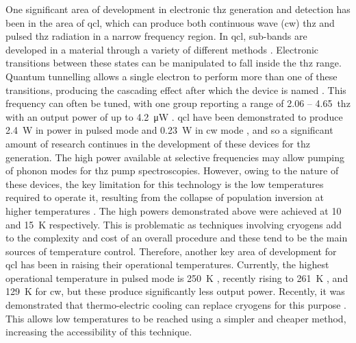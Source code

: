One significant area of development in electronic \acrshort{thz} generation and detection has been in the area of \acrfull{qcl}, which can produce both continuous wave (\acrshort{cw}) \acrshort{thz} and pulsed \acrshort{thz} radiation in a narrow frequency region. In \acrshort{qcl}, sub\nobreakdash-bands are developed in a material through a variety of different methods \DIFdelbegin \DIFdel{~}\DIFdelend \cite{Williams2007}. Electronic transitions between these states can be manipulated to fall inside the \acrshort{thz} range. Quantum tunnelling allows a single electron to perform more than one of these transitions, producing the cascading effect after which the device is named \DIFdelbegin \DIFdel{~}\DIFdelend \cite{Faist1994}.
This frequency can often be tuned, with one group reporting a range of 2.06 – \SI{4.65}{\acrshort{thz}} with an output power of up to \SI{4.2}{\micro W} \DIFdelbegin \DIFdel{~}\DIFdelend \cite{Lu2016}. 
\acrshort{qcl} have been demonstrated to produce \SI{2.4}{W} in power in pulsed mode \DIFdelbegin \DIFdel{~}\DIFdelend \cite{Lin2017} and \SI{0.23}{W} in \acrshort{cw} mode \DIFdelbegin \DIFdel{~}\DIFdelend \cite{Wang2016}, and so a significant amount of research continues in the development of these devices for \acrshort{thz} generation. The high power available at selective frequencies may allow pumping of phonon modes for \acrshort{thz} pump spectroscopies. 
However, owing to the nature of these devices, the key limitation for this technology is the low temperatures required to operate it, resulting from the collapse of population inversion at higher temperatures \DIFdelbegin \DIFdel{~}\DIFdelend \cite{Williams2007}. The high powers demonstrated above were achieved at 10 and \SI{15}{K} respectively. This is problematic as techniques involving cryogens add to the complexity and cost of an overall procedure and these tend to be the main sources of temperature control. Therefore, another key area of development for \acrshort{qcl} has been in raising their operational temperatures. Currently, the highest operational temperature in pulsed mode is \SI{250}{K} \DIFdelbegin \DIFdel{~}\DIFdelend \cite{Khalatpour2020}, recently rising to \SI{261}{K} \DIFdelbegin \DIFdel{~}\DIFdelend \cite{Khalatpour2022}, and \SI{129}{K} \DIFdelbegin \DIFdel{~}\DIFdelend \cite{Biermann2014} for \acrshort{cw}, but these produce significantly less output power.
Recently, it was demonstrated that thermo\nobreakdash-electric cooling can replace cryogens for this purpose \DIFdelbegin \DIFdel{~}\DIFdelend \cite{Kainz2019}. This allows low temperatures to be reached using a simpler and cheaper method, increasing the accessibility of this technique.
